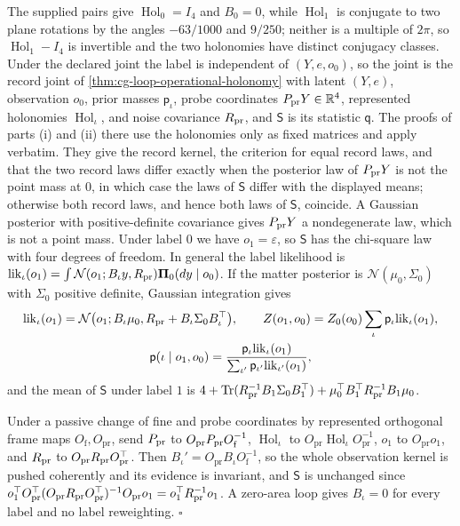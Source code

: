 The supplied pairs give \(\operatorname{Hol}_0=I_4\) and \(B_0=0\), while
\(\operatorname{Hol}_1\) is conjugate to two plane rotations by the angles
\(-63/1000\) and \(9/250\); neither is a multiple of \(2\pi\), so
\(\operatorname{Hol}_1-I_4\) is invertible and the two holonomies have distinct
conjugacy classes. Under the declared joint the label is independent of
\((Y,e,o_0)\), so the joint is the record joint of
\cref{thm:cg-loop-operational-holonomy} with latent \((Y,e)\), observation
\(o_0\), prior masses \(\mathsf p_\iota\), probe coordinates \(P_{\rm pr}Y\in\mathbb R^4\),
represented holonomies \(\operatorname{Hol}_\iota\), and noise covariance
\(R_{\rm pr}\), and \(\mathsf S\) is its statistic \(\mathsf q\). The proofs of
parts (i) and (ii) there use the holonomies only as fixed matrices and apply
verbatim. They give the record kernel, the criterion for equal record laws, and
that the two record laws differ exactly when the posterior law of
\(P_{\rm pr}Y\) is not the point mass at \(0\), in which case the laws of
\(\mathsf S\) differ with the displayed means; otherwise both record laws, and
hence both laws of \(\mathsf S\), coincide. A Gaussian posterior with
positive-definite covariance gives \(P_{\rm pr}Y\) a nondegenerate law, which is
not a point mass. Under label \(0\) we have \(o_1=\varepsilon\), so \(\mathsf S\)
has the chi-square law with four degrees of freedom. In general the
label likelihood is
\(\mathrm{lik}_\iota(o_1)=\int\mathcal N(o_1;B_\iota y,R_{\rm pr})\boldsymbol\Pi_0(dy\mid o_0)\).
If the matter posterior is \(\mathcal N(\mu_0,\Sigma_0)\) with \(\Sigma_0\)
positive definite, Gaussian integration gives
\begin{equation}
\begin{gathered}
 \mathrm{lik}_\iota(o_1)=\mathcal N\bigl(o_1;B_\iota\mu_0,R_{\rm pr}+B_\iota\Sigma_0B_\iota^\top\bigr),\qquad
 Z(o_1,o_0)=Z_0(o_0)\sum_\iota\mathsf p_\iota\mathrm{lik}_\iota(o_1),\\
 \mathsf p(\iota\mid o_1,o_0)=\frac{\mathsf p_\iota\mathrm{lik}_\iota(o_1)}{\sum_{\iota'}\mathsf p_{\iota'}\mathrm{lik}_{\iota'}(o_1)},
\end{gathered}
\label{eq:rg-cover-loop-evidence}
\end{equation}
and the mean of \(\mathsf S\) under label \(1\) is
\(4+\operatorname{Tr}(R_{\rm pr}^{-1}B_1\Sigma_0B_1^\top)+\mu_0^\top B_1^\top R_{\rm pr}^{-1}B_1\mu_0\).

Under a passive change of fine and probe coordinates by represented orthogonal
frame maps \(O_{\mathrm f},O_{\mathrm{pr}}\), send \(P_{\rm pr}\) to
\(O_{\mathrm{pr}}P_{\rm pr}O_{\mathrm f}^{-1}\), \(\operatorname{Hol}_\iota\) to
\(O_{\mathrm{pr}}\operatorname{Hol}_\iota O_{\mathrm{pr}}^{-1}\), \(o_1\) to
\(O_{\mathrm{pr}}o_1\), and \(R_{\rm pr}\) to
\(O_{\mathrm{pr}}R_{\rm pr}O_{\mathrm{pr}}^\top\). Then
\(B_\iota'=O_{\mathrm{pr}}B_\iota O_{\mathrm f}^{-1}\), so the whole observation
kernel is pushed coherently and its evidence is invariant, and \(\mathsf S\) is
unchanged since
\(o_1^\top O_{\mathrm{pr}}^\top(O_{\mathrm{pr}}R_{\rm pr}O_{\mathrm{pr}}^\top)^{-1}O_{\mathrm{pr}}o_1
=o_1^\top R_{\rm pr}^{-1}o_1\). A zero-area loop gives \(B_\iota=0\) for every
label and no label reweighting. \(\square\)

